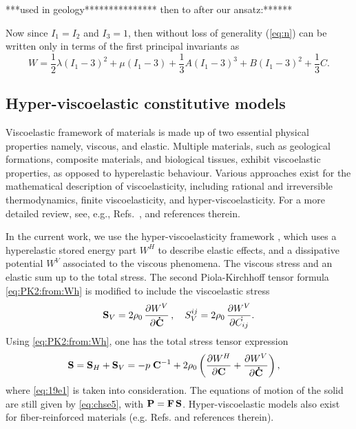 \documentclass[11pt,letter,subeqn,fleqn]{article}
\numberwithin{equation}{section}
\numberwithin{table}{section}
\numberwithin{figure}{section}
\def\beq{\begin{equation}}
\def\eeq{\end{equation}}
\def\vec#1{{\boldsymbol{\rm #1}}} %
\def\tens#1{{\boldsymbol{\rm #1}}} %
\def\vec#1{{\boldsymbol{\rm #1}}} %
\def\tens#1{{\boldsymbol{\rm #1}}} %
\begin{document}
***used in geology*************** then to after our ansatz:******

Now since $I_{1}=I_{2}$ and $I_{3}=1$, then without loss of generality (\ref{eq:n}) can be written only in terms of the first principal invariants as
\begin{equation}\label{eq:n1}
W=\frac{1}{2}\lambda (I_{1}-3)^{2}+\mu (I_{1}-3)+\frac{1}{3} A (I_{1}-3)^{3}+B (I_{1}-3)^{2}+\frac{1}{3}C.
\end{equation}


\subsection{Hyper-viscoelastic constitutive models}\label{sec:visco:framew}

Viscoelastic framework of materials is made up of two essential physical properties namely, viscous, and elastic. Multiple materials, such as geological formations, composite materials, and biological tissues, exhibit viscoelastic properties, as opposed to hyperelastic behaviour. Various approaches exist for the mathematical description of viscoelasticity, including rational and irreversible thermodynamics, finite viscoelasticity, and hyper-viscoelasticity. For a more detailed review, see, e.g., Refs.~\cite{thesisBader, cheviakov2016one}, and references therein.

In the current work, we use the hyper-viscoelasticity framework \cite{holzapfel2000nonlinear}, which uses a hyperelastic stored energy part $W^H$ to describe elastic effects, and a dissipative potential $W^V$ associated to the viscous phenomena. The viscous stress and an elastic sum up to the total stress. The second Piola-Kirchhoff tensor formula \eqref{eq:PK2:from:Wh} is modified to include the viscoelastic stress
\beq\label{eq:PK2:viscoel}
\tens{S}_V = 2 \rho_0 \,\dfrac{\partial W^V}{\partial\tens{\dot{C}}}\,, \quad S^{ij}_{V}=2 \rho_0 \,\dfrac{\partial W^V}{\partial{\dot{C_{ij}}}}.
\eeq
Using \eqref{eq:PK2:from:Wh}, one has the total stress tensor expression
\beq\label{eq:PK2:viscoel:tot}
\tens{S} = \tens{S}_H + \tens{S}_V = -p\;\tens{C}^{-1} + 2 \rho_0 \left(\dfrac{\partial W^H}{\partial\tens{C}} + \dfrac{\partial W^V}{\partial\tens{\dot{C}}}\right), \quad
\eeq
where \eqref{eq:19e1} is taken into consideration. The equations of motion of the solid are still given by \eqref{eq:chse5}, with $\tens{P} = \tens{F}\,\tens{S}$. Hyper-viscoelastic models also exist for fiber-reinforced materials (e.g. Refs. \cite{cheviakov2016one,pioletti2000non} and references therein).
\end{document}
